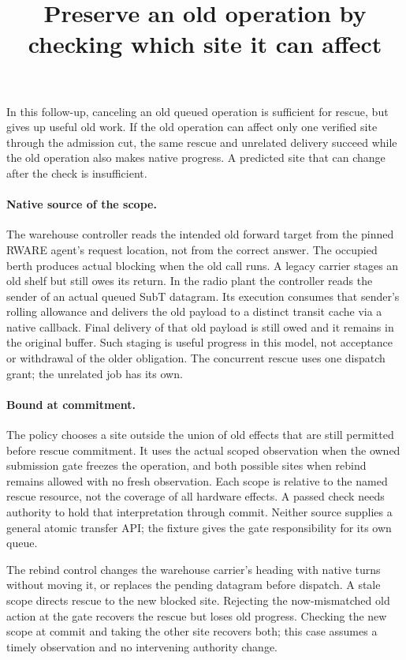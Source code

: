 \documentclass{article}
\title{Preserve an old operation by checking which site it can affect}
\begin{document}
\maketitle
In this follow-up, canceling an old queued operation is sufficient
for rescue, but gives up useful old work. If the old operation
can affect only one verified site through the admission cut,
the same rescue and unrelated delivery succeed while the old
operation also makes native progress. A predicted site that can
change after the check is insufficient.

\paragraph{Native source of the scope.}
The warehouse controller reads the intended old forward target
from the pinned RWARE agent's request location, not from the
correct answer. The occupied berth produces actual blocking when
the old call runs. A legacy carrier stages an old shelf but still
owes its return. In the radio plant the controller reads the
sender of an actual queued SubT datagram. Its execution consumes
that sender's rolling allowance and delivers the old payload to
a distinct transit cache via a native callback. Final delivery of
that old payload is still owed and it remains in the original
buffer. Such staging is useful progress in this model, not
acceptance or withdrawal of the older obligation. The concurrent
rescue uses one dispatch grant; the unrelated job has its own.

\paragraph{Bound at commitment.}
The policy chooses a site outside the union of old effects that
are still permitted before rescue commitment. It uses the actual
scoped observation when the owned submission gate freezes the
operation, and both possible sites when rebind remains allowed
with no fresh observation. Each scope is relative to the named
rescue resource, not the coverage of all hardware effects.
A passed check needs authority to hold that interpretation
through commit. Neither source supplies a general atomic transfer
API; the fixture gives the gate responsibility for its own queue.

The rebind control changes the warehouse carrier's heading with
native turns without moving it, or replaces the pending datagram
before dispatch. A stale scope directs rescue to the new blocked
site. Rejecting the now-mismatched old action at the gate recovers
the rescue but loses old progress. Checking the new scope at
commit and taking the other site recovers both; this case
assumes a timely observation and no intervening authority change.
\end{document}
